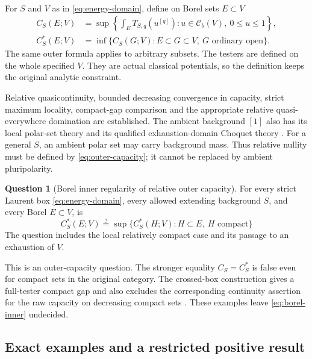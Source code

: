 \documentclass[11pt,a4paper]{article}
\newcommand{\MathEqref}[1]{{\hypersetup{linkcolor=EquationLink}\eqref{#1}}}
\theoremstyle{definition}
\newtheorem{question}[theorem]{Question}
\theoremstyle{remark}
\numberwithin{equation}{section}
\newcommand{\Cb}{\mathcal C_b}
\begin{document}
For $S$ and $V$ as in \MathEqref{eq:energy-domain}, define on Borel
sets $E\subset V$
\begin{align}
 C_S(E;V)
   &=\sup\left\{\int_E T_{S,q}(u^{[q]}):
                   u\in\Cb(V),\ 0\le u\le1\right\},
                         \label{eq:raw-capacity}\\
 C_S^*(E;V)
   &=\inf\{C_S(G;V): E\subset G\subset V,
                                      \ G\text{ ordinary open}\}.
                         \label{eq:outer-capacity}
\end{align}
The same outer formula applies to arbitrary subsets.  The testers are
defined on the whole specified $V$.  They are actual classical
potentials, so the definition keeps the original analytic constraint.

Relative quasicontinuity, bounded decreasing convergence in capacity,
strict maximum locality, compact-gap comparison and the appropriate
relative quasi-everywhere domination are established.  The ambient
background $[1]$ also has its local polar-set theory and its qualified
exhaustion-domain Choquet theory \cite{Rchain}.  For a general $S$, an
ambient polar set may carry background mass.  Thus relative nullity
must be defined by \MathEqref{eq:outer-capacity}; it cannot be replaced
by ambient pluripolarity.

\begin{question}[Borel inner regularity of relative outer capacity]
\label{question:outer}
For every strict Laurent box \MathEqref{eq:energy-domain}, every
allowed extending background $S$, and every Borel $E\subset V$, is
\begin{equation}
 C_S^*(E;V)\overset{?}{=}\sup\{C_S^*(H;V): H\subset E,\ H\text{ compact}\}
                         \label{eq:borel-inner}
\end{equation}
The question includes the local relatively compact case and its
passage to an exhaustion of $V$.
\end{question}

This is an outer-capacity question.  The stronger equality
$C_S=C_S^*$ is false even for compact sets in the original category.
The crossed-box construction gives a full-tester compact gap and also
excludes the corresponding continuity assertion for the raw capacity
on decreasing compact sets \cite{R24}.  These examples leave
\MathEqref{eq:borel-inner} undecided.

\subsection{Exact examples and a restricted positive result}
\end{document}
